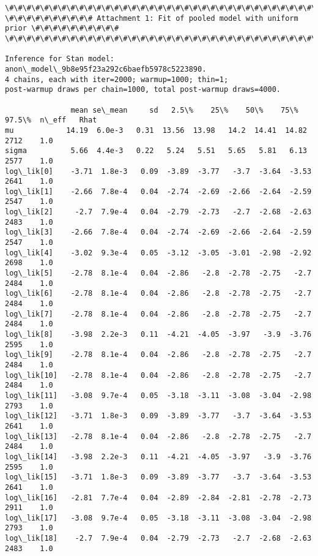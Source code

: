 \documentclass[11pt]{article}
\begin{document}
    \begin{Verbatim}[commandchars=\\\{\}]
\#\#\#\#\#\#\#\#\#\#\#\#\#\#\#\#\#\#\#\#\#\#\#\#\#\#\#\#\#\#\#\#\#\#\#\#\#\#\#\#\#\#\#\#\#\#\#\#\#\#\#\#\#\#\#\#\#\#\#\#\#\#\#\#\#\#\#\#\#\#\#\#\#\#
\#\#\#\#\#\#\#\#\#\# Attachment 1: Fit of pooled model with uniform prior \#\#\#\#\#\#\#\#\#\#
\#\#\#\#\#\#\#\#\#\#\#\#\#\#\#\#\#\#\#\#\#\#\#\#\#\#\#\#\#\#\#\#\#\#\#\#\#\#\#\#\#\#\#\#\#\#\#\#\#\#\#\#\#\#\#\#\#\#\#\#\#\#\#\#\#\#\#\#\#\#\#\#\#\#

Inference for Stan model: anon\_model\_9b8e95f23a292c6baefb5978c5223890.
4 chains, each with iter=2000; warmup=1000; thin=1; 
post-warmup draws per chain=1000, total post-warmup draws=4000.

               mean se\_mean     sd   2.5\%    25\%    50\%    75\%  97.5\%  n\_eff   Rhat
mu            14.19  6.0e-3   0.31  13.56  13.98   14.2  14.41  14.82   2712    1.0
sigma          5.66  4.4e-3   0.22   5.24   5.51   5.65   5.81   6.13   2577    1.0
log\_lik[0]    -3.71  1.8e-3   0.09  -3.89  -3.77   -3.7  -3.64  -3.53   2641    1.0
log\_lik[1]    -2.66  7.8e-4   0.04  -2.74  -2.69  -2.66  -2.64  -2.59   2547    1.0
log\_lik[2]     -2.7  7.9e-4   0.04  -2.79  -2.73   -2.7  -2.68  -2.63   2483    1.0
log\_lik[3]    -2.66  7.8e-4   0.04  -2.74  -2.69  -2.66  -2.64  -2.59   2547    1.0
log\_lik[4]    -3.02  9.3e-4   0.05  -3.12  -3.05  -3.01  -2.98  -2.92   2698    1.0
log\_lik[5]    -2.78  8.1e-4   0.04  -2.86   -2.8  -2.78  -2.75   -2.7   2484    1.0
log\_lik[6]    -2.78  8.1e-4   0.04  -2.86   -2.8  -2.78  -2.75   -2.7   2484    1.0
log\_lik[7]    -2.78  8.1e-4   0.04  -2.86   -2.8  -2.78  -2.75   -2.7   2484    1.0
log\_lik[8]    -3.98  2.2e-3   0.11  -4.21  -4.05  -3.97   -3.9  -3.76   2595    1.0
log\_lik[9]    -2.78  8.1e-4   0.04  -2.86   -2.8  -2.78  -2.75   -2.7   2484    1.0
log\_lik[10]   -2.78  8.1e-4   0.04  -2.86   -2.8  -2.78  -2.75   -2.7   2484    1.0
log\_lik[11]   -3.08  9.7e-4   0.05  -3.18  -3.11  -3.08  -3.04  -2.98   2793    1.0
log\_lik[12]   -3.71  1.8e-3   0.09  -3.89  -3.77   -3.7  -3.64  -3.53   2641    1.0
log\_lik[13]   -2.78  8.1e-4   0.04  -2.86   -2.8  -2.78  -2.75   -2.7   2484    1.0
log\_lik[14]   -3.98  2.2e-3   0.11  -4.21  -4.05  -3.97   -3.9  -3.76   2595    1.0
log\_lik[15]   -3.71  1.8e-3   0.09  -3.89  -3.77   -3.7  -3.64  -3.53   2641    1.0
log\_lik[16]   -2.81  7.7e-4   0.04  -2.89  -2.84  -2.81  -2.78  -2.73   2911    1.0
log\_lik[17]   -3.08  9.7e-4   0.05  -3.18  -3.11  -3.08  -3.04  -2.98   2793    1.0
log\_lik[18]    -2.7  7.9e-4   0.04  -2.79  -2.73   -2.7  -2.68  -2.63   2483    1.0

\end{Verbatim}
\end{document}
